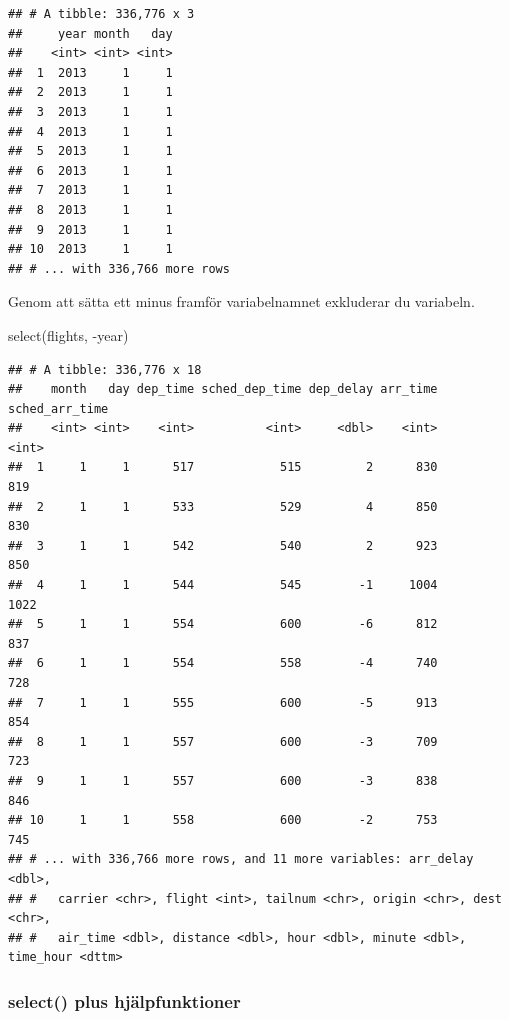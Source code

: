 \documentclass[
]{book}
\newenvironment{Shaded}{\begin{snugshade}}{\end{snugshade}}
\newcommand{\FunctionTok}[1]{\textcolor[rgb]{0.00,0.00,0.00}{#1}}
\newcommand{\NormalTok}[1]{#1}
\newcommand{\SpecialCharTok}[1]{\textcolor[rgb]{0.00,0.00,0.00}{#1}}
\begin{document}
\begin{verbatim}
## # A tibble: 336,776 x 3
##     year month   day
##    <int> <int> <int>
##  1  2013     1     1
##  2  2013     1     1
##  3  2013     1     1
##  4  2013     1     1
##  5  2013     1     1
##  6  2013     1     1
##  7  2013     1     1
##  8  2013     1     1
##  9  2013     1     1
## 10  2013     1     1
## # ... with 336,766 more rows
\end{verbatim}

Genom att sätta ett minus framför variabelnamnet exkluderar du variabeln.

\begin{Shaded}
\begin{Highlighting}[]
\FunctionTok{select}\NormalTok{(flights, }\SpecialCharTok{{-}}\NormalTok{year)}
\end{Highlighting}
\end{Shaded}

\begin{verbatim}
## # A tibble: 336,776 x 18
##    month   day dep_time sched_dep_time dep_delay arr_time sched_arr_time
##    <int> <int>    <int>          <int>     <dbl>    <int>          <int>
##  1     1     1      517            515         2      830            819
##  2     1     1      533            529         4      850            830
##  3     1     1      542            540         2      923            850
##  4     1     1      544            545        -1     1004           1022
##  5     1     1      554            600        -6      812            837
##  6     1     1      554            558        -4      740            728
##  7     1     1      555            600        -5      913            854
##  8     1     1      557            600        -3      709            723
##  9     1     1      557            600        -3      838            846
## 10     1     1      558            600        -2      753            745
## # ... with 336,766 more rows, and 11 more variables: arr_delay <dbl>,
## #   carrier <chr>, flight <int>, tailnum <chr>, origin <chr>, dest <chr>,
## #   air_time <dbl>, distance <dbl>, hour <dbl>, minute <dbl>, time_hour <dttm>
\end{verbatim}

\hypertarget{select-plus-hjuxe4lpfunktioner}{%
\subsubsection{select() plus hjälpfunktioner}\label{select-plus-hjuxe4lpfunktioner}}
\end{document}

